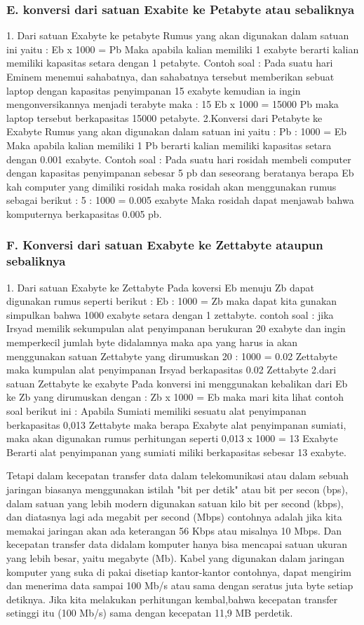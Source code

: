 \subsubsection {E. konversi dari satuan Exabite ke Petabyte atau sebaliknya}

1. Dari satuan Exabyte ke petabyte
Rumus yang akan digunakan dalam satuan ini yaitu :
Eb x 1000 = Pb
Maka apabila kalian memiliki 1 exabyte berarti kalian memiliki kapasitas setara dengan 1 petabyte.
Contoh soal :
Pada suatu hari Eminem menemui sahabatnya, dan sahabatnya tersebut memberikan sebuat laptop dengan kapasitas penyimpanan 15 exabyte kemudian ia ingin mengonversikannya menjadi terabyte maka :
15 Eb x 1000 = 15000 Pb maka laptop tersebut berkapasitas 15000 petabyte.
2.Konversi dari Petabyte ke Exabyte
Rumus yang akan digunakan dalam satuan ini yaitu :
Pb : 1000 = Eb
Maka apabila kalian memiliki 1 Pb berarti kalian memiliki kapasitas setara dengan 0.001 exabyte.
Contoh soal :
Pada suatu hari rosidah membeli computer dengan kapasitas penyimpanan sebesar 5 pb dan seseorang beratanya berapa Eb kah computer yang dimiliki rosidah maka rosidah akan menggunakan rumus sebagai berikut :
5 : 1000 = 0.005 exabyte
Maka rosidah dapat menjawab bahwa komputernya berkapasitas 0.005 pb.

\subsubsection {F. Konversi dari satuan Exabyte ke Zettabyte ataupun sebaliknya}
1. Dari satuan Exabyte ke Zettabyte
Pada koversi Eb menuju Zb dapat digunakan rumus seperti berikut :
Eb : 1000 = Zb
maka dapat kita gunakan simpulkan bahwa 1000 exabyte setara dengan 1 zettabyte.
contoh soal :
jika Irsyad memilik sekumpulan alat penyimpanan berukuran 20 exabyte dan ingin memperkecil jumlah byte didalamnya maka apa yang harus ia akan menggunakan satuan Zettabyte yang dirumuskan
20 : 1000 = 0.02 Zettabyte
maka kumpulan alat penyimpanan Irsyad berkapasitas 0.02 Zettabyte
2.dari satuan Zettabyte ke exabyte
Pada konversi ini menggunakan kebalikan dari Eb ke Zb yang dirumuskan dengan :
Zb x 1000 = Eb
maka mari kita lihat contoh soal berikut ini :
Apabila Sumiati memiliki sesuatu alat penyimpanan berkapasitas 0,013 Zettabyte maka berapa Exabyte alat penyimpanan sumiati, maka akan digunakan rumus perhitungan seperti
0,013 x 1000 = 13 Exabyte
Berarti alat penyimpanan yang sumiati miliki berkapasitas sebesar 13 exabyte.

Tetapi dalam kecepatan transfer data dalam telekomunikasi atau dalam sebuah jaringan biasanya menggunakan istilah "bit per detik" atau
bit per secon (bps), dalam satuan yang lebih modern digunakan satuan kilo bit per second (kbps), dan diatasnya lagi ada megabit per second (Mbps)
contohnya adalah jika kita memakai jaringan akan ada keterangan 56 Kbps atau misalnya 10 Mbps. Dan kecepatan transfer data didalam komputer hanya bisa mencapai satuan ukuran yang lebih besar, yaitu megabyte (Mb). Kabel yang digunakan dalam jaringan komputer yang suka di pakai disetiap kantor-kantor  contohnya, dapat mengirim dan menerima data sampai 100 Mb/s atau sama dengan seratus juta byte setiap detiknya. Jika kita melakukan perhitungan kembal,bahwa kecepatan transfer setinggi itu (100 Mb/s) sama dengan kecepatan 11,9 MB perdetik.

